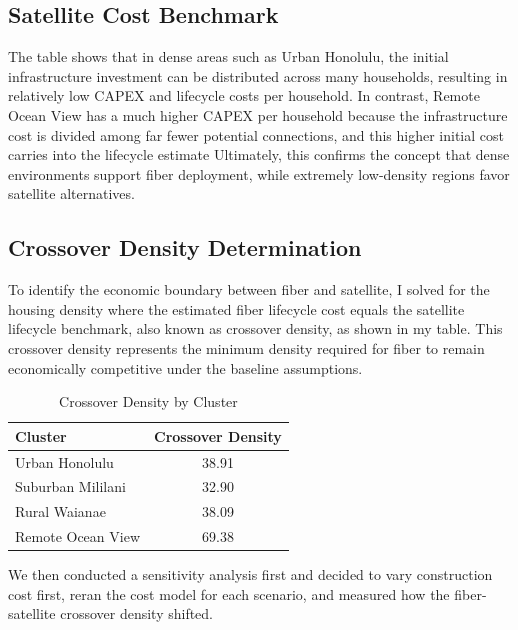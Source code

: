 \documentclass[conference]{IEEEtran}
\begin{document}
\subsection{Satellite Cost Benchmark}
\begin{table}[htbp]
\centering
\small
\caption{Results: Baseline Comparison}
\label{tab:cluster_comparison}
\vspace{2mm}
\end{table}
The table shows that in dense areas such as Urban Honolulu, the initial infrastructure investment can be distributed across many households, resulting in relatively low CAPEX and lifecycle costs per household. 
In contrast, Remote Ocean View has a much higher CAPEX per household because the infrastructure cost is divided among far fewer potential connections, and this higher initial cost carries into the lifecycle estimate
Ultimately, this confirms the concept that dense environments support fiber deployment, while extremely low-density regions favor satellite alternatives.

\subsection{Crossover Density Determination}
To identify the economic boundary between fiber and satellite, I solved for the housing density where the estimated fiber lifecycle cost equals the satellite lifecycle benchmark, also known as crossover density, as shown in my table. This crossover density represents the minimum density required for fiber to remain economically competitive under the baseline assumptions. 
\begin{table}[htbp]
\centering
\small
\caption{Crossover Density by Cluster}
\label{tab:crossover_density}
\begin{tabular}{lc}
\toprule
\textbf{Cluster} & \textbf{Crossover Density} \\
\midrule
Urban Honolulu     & 38.91 \\
Suburban Mililani  & 32.90 \\
Rural Waianae     & 38.09 \\
Remote Ocean View  & 69.38 \\
\bottomrule
\end{tabular}
\end{table}
We then conducted a sensitivity analysis first and decided to vary construction cost first, reran the cost model for each scenario, and measured how the fiber-satellite crossover density shifted.
\end{document}
